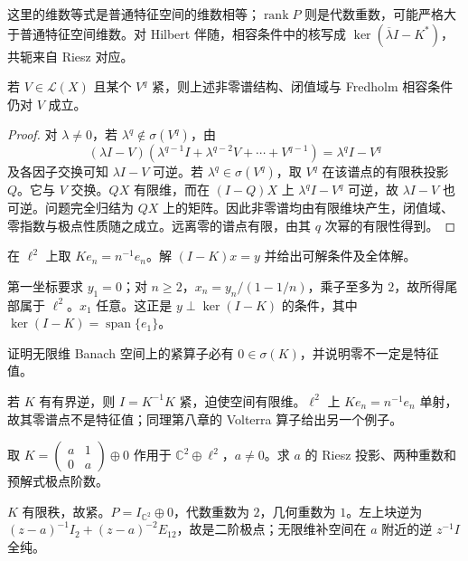 这里的维数等式是普通特征空间的维数相等；$\operatorname{rank}P$ 则是代数重数，可能严格大于普通特征空间维数。对 Hilbert 伴随，相容条件中的核写成 $\ker(\overline\lambda I-K^*)$，共轭来自 Riesz 对应。

\begin{proposition}[幂紧推广]\label{prop:y10-power-compact}
若 $V\in\mathcal L(X)$ 且某个 $V^q$ 紧，则上述非零谱结构、闭值域与 Fredholm 相容条件仍对 $V$ 成立。
\end{proposition}
\begin{proof}
对 $\lambda\ne0$，若 $\lambda^q\notin\sigma(V^q)$，由
\[
 (\lambda I-V)(\lambda^{q-1}I+\lambda^{q-2}V+\cdots+V^{q-1})
 =\lambda^qI-V^q
\]
及各因子交换可知 $\lambda I-V$ 可逆。若 $\lambda^q\in\sigma(V^q)$，取 $V^q$ 在该谱点的有限秩投影 $Q$。它与 $V$ 交换。$QX$ 有限维，而在 $(I-Q)X$ 上 $\lambda^qI-V^q$ 可逆，故 $\lambda I-V$ 也可逆。问题完全归结为 $QX$ 上的矩阵。因此非零谱均由有限维块产生，闭值域、零指数与极点性质随之成立。远离零的谱点有限，由其 $q$ 次幂的有限性得到。
\end{proof}

\begin{exercise}[共振的相容条件]\label{ex:y10-resonance}
在 $\ell^2$ 上取 $Ke_n=n^{-1}e_n$。解 $(I-K)x=y$ 并给出可解条件及全体解。
\end{exercise}
\begin{solution}
第一坐标要求 $y_1=0$；对 $n\ge2$，$x_n=y_n/(1-1/n)$，乘子至多为 $2$，故所得尾部属于 $\ell^2$。$x_1$ 任意。这正是 $y\perp\ker(I-K)$ 的条件，其中 $\ker(I-K)=\operatorname{span}\{e_1\}$。
\end{solution}

\begin{exercise}[零谱点的例外]\label{ex:y10-zero}
证明无限维 Banach 空间上的紧算子必有 $0\in\sigma(K)$，并说明零不一定是特征值。
\end{exercise}
\begin{solution}
若 $K$ 有有界逆，则 $I=K^{-1}K$ 紧，迫使空间有限维。$\ell^2$ 上 $Ke_n=n^{-1}e_n$ 单射，故其零谱点不是特征值；同理第八章的 Volterra 算子给出另一个例子。
\end{solution}

\begin{exercise}[代数重数与几何重数]\label{ex:y10-jordan}
取 $K=\left(\begin{smallmatrix}a&1\\0&a\end{smallmatrix}\right)\oplus0$ 作用于 $\mathbb C^2\oplus\ell^2$，$a\ne0$。求 $a$ 的 Riesz 投影、两种重数和预解式极点阶数。
\end{exercise}
\begin{solution}
$K$ 有限秩，故紧。$P=I_{\mathbb C^2}\oplus0$，代数重数为 $2$，几何重数为 $1$。左上块逆为 $(z-a)^{-1}I_2+(z-a)^{-2}E_{12}$，故是二阶极点；无限维补空间在 $a$ 附近的逆 $z^{-1}I$ 全纯。
\end{solution}
